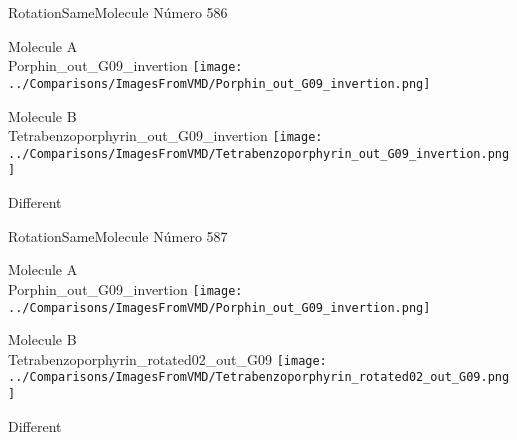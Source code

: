 \vtab[-3cm]
\begin{center}
{\large RotationSameMolecule \tab Número 586}
\end{center}
\begin{multicols}{2}
\begin{center}
Molecule A \\ 
Porphin\_out\_G09\_invertion
\texttt{[image: ../Comparisons/ImagesFromVMD/Porphin\_out\_G09\_invertion.png]}
\\
\vtab

\columnbreak
Molecule B \\ 
Tetrabenzoporphyrin\_out\_G09\_invertion
\texttt{[image: ../Comparisons/ImagesFromVMD/Tetrabenzoporphyrin\_out\_G09\_invertion.png]}
\\
\vtab


\end{center}
\end{multicols}
\begin{center}
\textcolor{NavyBlue}{\Large Different}
\end{center}

 \newpage

\vtab[-3cm]
\begin{center}
{\large RotationSameMolecule \tab Número 587}
\end{center}
\begin{multicols}{2}
\begin{center}
Molecule A \\ 
Porphin\_out\_G09\_invertion
\texttt{[image: ../Comparisons/ImagesFromVMD/Porphin\_out\_G09\_invertion.png]}
\\
\vtab

\columnbreak
Molecule B \\ 
Tetrabenzoporphyrin\_rotated02\_out\_G09
\texttt{[image: ../Comparisons/ImagesFromVMD/Tetrabenzoporphyrin\_rotated02\_out\_G09.png]}
\\
\vtab


\end{center}
\end{multicols}
\begin{center}
\textcolor{NavyBlue}{\Large Different}
\end{center}

 \newpage


